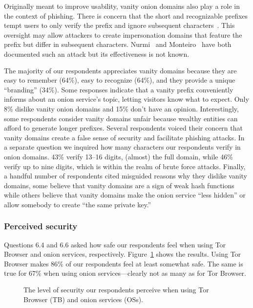 Originally meant to improve usability, vanity onion domains also play a role in
the context of phishing.  There is concern that the short and recognizable
prefixes tempt users to only verify the prefix and ignore subsequent
characters~\cite{Winter2015a}.  This oversight may allow attackers to create
impersonation domains that feature the prefix but differ in subsequent
characters.  Nurmi~\cite{Nurmi2015a} and Monteiro~\cite{Monteiro2016a} have both
documented such an attack but its effectiveness is not known.

The majority of our respondents appreciates vanity domains because they are easy
to remember (64\%), easy to recognize (64\%), and they provide a unique
``branding'' (34\%).  Some responses indicate that a vanity prefix conveniently
informs about an onion service's topic, letting visitors know what to expect.
Only 8\% dislike vanity onion domains and 15\% don't have an opinion.
Interestingly, some respondents consider vanity domains unfair because wealthy
entities can afford to generate longer prefixes.  Several respondents voiced
their concern that vanity domains create a false sense of security and
facilitate phishing attacks.  In a separate question we inquired how many
characters our respondents verify in onion domains.  43\% verify 13--16 digits,
\ie (almost) the full domain, while 46\% verify up to nine digits, which is
within the realm of brute force attacks.  Finally, a handful number of
respondents cited misguided reasons why they dislike vanity domains, \eg some
believe that vanity domains are a sign of weak hash functions while others
believe that vanity domains make the onion service ``less hidden'' or allow
somebody to create ``the same private key.''

\subsubsection{Perceived security}

Questions 6.4 and 6.6 asked how safe our respondents feel when using Tor Browser
and onion services, respectively.  Figure~\ref{fig:perceived-security} shows the
results.  Using Tor Browser makes 86\% of our respondents feel at least somewhat
safe.  The same is true for 67\% when using onion services---clearly not as many
as for Tor Browser.

\begin{figure}[t]
    \centering
    
    \caption{The level of security our respondents perceive when using Tor
    Browser (TB) and onion services (OSs).}
    \label{fig:perceived-security}
\end{figure}

